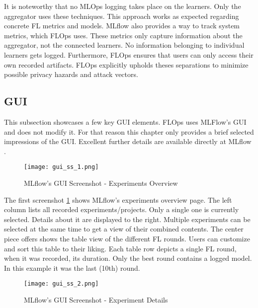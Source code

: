 It is noteworthy that no MLOps logging takes place on the learners.
Only the aggregator uses these techniques.
This approach works as expected regarding concrete FL metrics and models.
MLflow also provides a way to track system metrics, which FLOps uses.
These metrics only capture information about the aggregator, not the connected learners.
No information belonging to individual learners gets logged.
Furthermore, FLOps ensures that users can only access their own recorded artifacts.
FLOps explicitly upholds theses separations to minimize possible privacy hazards and attack vectors.

\subsection{GUI}

This subsection showcases a few key GUI elements.
FLOps uses MLFlow's GUI and does not modify it.
For that reason this chapter only provides a brief selected impressions of the GUI.
Excellent further details are available directly at MLflow \cite{mlflow:homepage}.

\begin{figure}[p]
    \begin{adjustwidth}{-0.1\paperwidth}{-0.1\paperwidth}
        \centering
        \texttt{[image: gui\_ss\_1.png]}
        \caption{MLflow's GUI Screenshot - Experiments Overview}
        \label{fig:gui_ss_1}
    \end{adjustwidth}
\end{figure}

The first screenshot \ref{fig:gui_ss_1} shows MLflow's experiments overview page.
The left column lists all recorded experiments/projects.
Only a single one is currently selected.
Details about it are displayed to the right.
Multiple experiments can be selected at the same time to get a view of their combined contents.
The center piece offers shows the table view of the different FL rounds.
Users can customize and sort this table to their liking.
Each table row depicts a single FL round, when it was recorded, its duration.
Only the best round contains a logged model.
In this example it was the last (10th) round.

\begin{figure}[p]
    \begin{adjustwidth}{-0.1\paperwidth}{-0.1\paperwidth}
        \centering
        \texttt{[image: gui\_ss\_2.png]}
        \caption{MLflow's GUI Screenshot - Experiment Details}
        \label{fig:gui_ss_2}
    \end{adjustwidth}
\end{figure}

